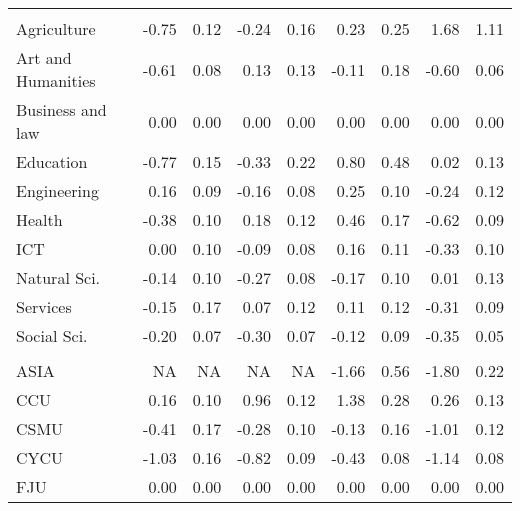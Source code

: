 \begin{longtable}[t]{lrrrrrrrr}
\endfoot
\bottomrule
\endlastfoot
\addlinespace[0.3em]
\multicolumn{9}{l}{\textit{\textbf{Panel A: }}}\\
\hspace{1em}Agriculture & -0.75 & 0.12 & -0.24 & 0.16 & 0.23 & 0.25 & 1.68 & 1.11\\
\hspace{1em}Art and Humanities & -0.61 & 0.08 & 0.13 & 0.13 & -0.11 & 0.18 & -0.60 & 0.06\\
\hspace{1em}Business and law & 0.00 & 0.00 & 0.00 & 0.00 & 0.00 & 0.00 & 0.00 & 0.00\\
\hspace{1em}Education & -0.77 & 0.15 & -0.33 & 0.22 & 0.80 & 0.48 & 0.02 & 0.13\\
\hspace{1em}Engineering & 0.16 & 0.09 & -0.16 & 0.08 & 0.25 & 0.10 & -0.24 & 0.12\\
\hspace{1em}Health & -0.38 & 0.10 & 0.18 & 0.12 & 0.46 & 0.17 & -0.62 & 0.09\\
\hspace{1em}ICT & 0.00 & 0.10 & -0.09 & 0.08 & 0.16 & 0.11 & -0.33 & 0.10\\
\hspace{1em}Natural Sci. & -0.14 & 0.10 & -0.27 & 0.08 & -0.17 & 0.10 & 0.01 & 0.13\\
\hspace{1em}Services & -0.15 & 0.17 & 0.07 & 0.12 & 0.11 & 0.12 & -0.31 & 0.09\\
\hspace{1em}Social Sci. & -0.20 & 0.07 & -0.30 & 0.07 & -0.12 & 0.09 & -0.35 & 0.05\\
\addlinespace[0.3em]
\multicolumn{9}{l}{\textit{\textbf{Panel B: }}}\\
\hspace{1em}ASIA & NA & NA & NA & NA & -1.66 & 0.56 & -1.80 & 0.22\\
\hspace{1em}CCU & 0.16 & 0.10 & 0.96 & 0.12 & 1.38 & 0.28 & 0.26 & 0.13\\
\hspace{1em}CSMU & -0.41 & 0.17 & -0.28 & 0.10 & -0.13 & 0.16 & -1.01 & 0.12\\
\hspace{1em}CYCU & -1.03 & 0.16 & -0.82 & 0.09 & -0.43 & 0.08 & -1.14 & 0.08\\
\hspace{1em}FJU & 0.00 & 0.00 & 0.00 & 0.00 & 0.00 & 0.00 & 0.00 & 0.00\\

\end{longtable}
